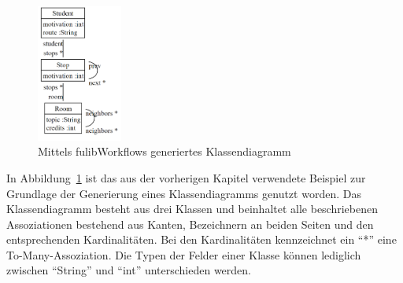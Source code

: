 \begin{figure}[h]
    \centering
    \includegraphics[width=0.25\textwidth]{images/3.1.4/class_diagram}
    \caption{Mittels fulibWorkflows generiertes Klassendiagramm}
    \label{fig:generated-class}
\end{figure}

In Abbildung~\ref{fig:generated-class} ist das aus der vorherigen Kapitel verwendete Beispiel zur Grundlage der Generierung eines Klassendiagramms genutzt worden.
Das Klassendiagramm besteht aus drei Klassen und beinhaltet alle beschriebenen Assoziationen bestehend aus Kanten, Bezeichnern an beiden Seiten und den entsprechenden
Kardinalitäten.
Bei den Kardinalitäten kennzeichnet ein ``*'' eine To-Many-Assoziation.
Die Typen der Felder einer Klasse können lediglich zwischen ``String'' und ``int'' unterschieden werden.
